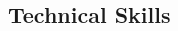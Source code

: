 \documentclass[12pt]{article} %
\begin{document}
\begin{paracol}{2}



	
	
	
	
	
	


\section{Technical Skills} 





	
	

\end{paracol}
\end{document}

